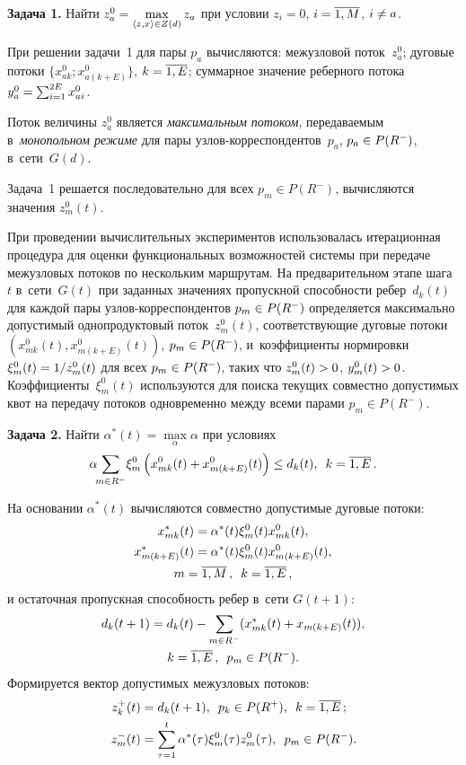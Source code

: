 \begin{multicols}{2}
\smallskip

\noindent
\textbf{Задача 1.} Найти
$z_a^0\hm=\max\limits_{\langle z,x\rangle \in Z(d)} z_a
$
при условии $z_{i}=0$, $i\hm=\overline{1,M}$, $i\hm\ne a$.

При решении задачи~1 для пары $p_{a}$ вы\-чис\-ля\-ют\-ся: межузловой
поток~$z_a^0$; дуговые потоки $\{x^{0}_{ak};x^{0}_{a(k+E)}\}$,
$k\hm=\overline{1,E}$; суммарное значение реберного
потока~$y_{a}^{0}\hm=\sum\nolimits_{i=1}^{2E} {x}_{ai}^{0}$.

Поток величины $z_a^0$ является \textit{максимальным потоком},
пе\-ре\-да\-ва\-емым в~\textit{монопольном режиме} для пары
уз\-лов-кор\-рес\-пон\-ден\-тов~$p_{a}$, $p_{a}\hm\in P(R^-)$, в~сети~$G(d)$.

Задача~1 решается последовательно для всех $p_{m}\in P(R^-)$,
вы\-чис\-ля\-ют\-ся значения $z_{m}^{0}(t)$.

При проведении вычислительных экспериментов использовалась
итерационная процедура для оценки функциональных возможностей
сис\-те\-мы при передаче межузловых потоков по нескольким маршрутам.
На предварительном этапе шага~$t$ в~сети~$G(t)$ при заданных
значениях пропускной спо\-соб\-ности ребер~$d_k(t)$ для каждой \mbox{пары}
уз\-лов-кор\-рес\-пон\-ден\-тов $p_m\hm\in P(R^-)$ определяется максимально
допустимый однопродуктовый поток~$z^0_m(t)$, со\-от\-вет\-ст\-ву\-ющие
дуговые потоки $(x_{mk}^0(t),x_{m(k+E)}^0(t))$, $p_m\hm\in P(R^-)$, и~коэффициенты нормировки
$\xi_m^0(t)\hm={1}/{z_m^0(t)}$ для всех  $p_m\hm \in P(R^-)$,
таких что $z^0_m(t)\hm>0$, $y_m^0(t)\hm>0$.
Коэффициенты~$\xi_m^0(t)$ используются для поиска текущих
совместно допустимых квот на передачу потоков одновременно между
всеми парами $p_m\in P(R^-)$.

\smallskip

\noindent
\textbf{Задача 2.} Найти $\alpha^*(t)=\max\limits_\alpha \alpha$
при условиях
$$
\alpha\!\!\sum\limits_{m\in R^-}\! \xi_m^0\left(x_{mk}^0(t)+x_{m(k+E)}^0(t)\right)\le d_k(t),\enskip
k=\overline{1,E}\,.
$$

На основании $\alpha^*(t)$ вычисляются совместно допустимые
дуговые потоки:
\begin{multline*}
x_{mk}^*(t)=\alpha^*(t)\xi^0_m(t)x^0_{mk}(t),\\
x^*_{m(k+E)}(t)=\alpha^*(t)\xi^0_m(t)x^0_{m(k+E)}(t),
\\
m=\overline{1,M}\,,\enskip k=\overline{1,E}\,,
\end{multline*}
и остаточная пропускная способность ребер в~сети $G(t+1)$:
\begin{multline*}
d_k(t+1)=d_k(t)-\sum_{m\in R^-} (x_{mk}^*(t)+x_{m(k+E)}(t)),\\
k=\overline{1,E}\,,\enskip p_m\in P(R^-).
\end{multline*}
Формируется вектор допустимых межузловых потоков:
\begin{align*}
z_k^+(t)&=d_k(t+1),\enskip p_k\in P(R^+),\enskip k=\overline{1,E}\,;
\\
z_m^-(t)&=\sum\limits_{\tau=1}^t\alpha^*(\tau)\xi_m^0(\tau) z_m^0(\tau), \enskip p_m\in P(R^-).
\end{align*}


\end{multicols}

